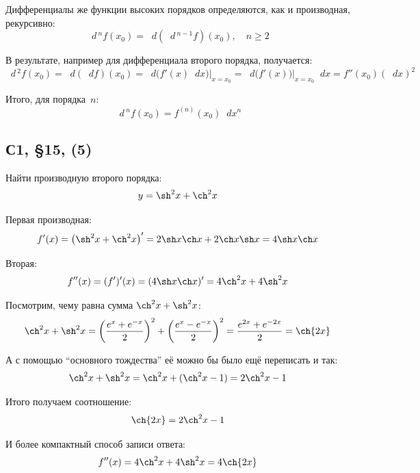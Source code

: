 \documentclass[a4paper,12pt]{article}
\newcommand{\diff}{\mathop{}\!d\!}
\begin{document}
  Дифференциалы же функции высоких порядков определяются, как и производная, рекурсивно:
  \[
    \diff\,^n f(x_0) = \diff \left(\diff\,^{n - 1} f\right)(x_0),\quad n \geq 2
  \]

  В результате, например для дифференциала второго порядка, получается:
  \[
    \diff\,^2 f(x_0) = \diff(\diff f)(x_0) = \left.\diff\bigl(f'(x) \diff x\bigr)\right|_{x = x_0}
      = \left.\diff\bigl(f'(x)\bigr)\right|_{x = x_0} \diff x
      = f''(x_0) (\diff x)^2
  \]

  Итого, для порядка~$n$:
  \begin{equation}
    \diff\,^n f(x_0) = f^{(n)}(x_0) \diff x^n
  \end{equation}
  

  \subsection{С1, \S 15, (5)}

  Найти производную второго порядка:
  \[
    y = \sh^2 x + \ch^2 x
  \]
  
  \begin{solution}
    Первая производная:
    \[
      f'(x) = \left(\sh^2 x + \ch^2 x\right)' = 2 \sh x \ch x + 2 \ch x \sh x = 4 \sh x \ch x
    \]

    Вторая:
    \[
      f''(x) = (f')'(x) = (4 \sh x \ch x)' = 4 \ch^2 x + 4 \sh^2 x
    \]


    \begin{remark}
      Посмотрим, чему равна сумма $\ch^2 x \hm+ \sh^2 x$:
      \[
        \ch^2 x + \sh^2 x
          = \left(\frac{e^x + e^{-x}}{2}\right)^2 + \left(\frac{e^x - e^{-x}}{2}\right)^2
          = \frac{e^{2x} + e^{-2x}}{2}
          = \ch{2x}
      \]

      А с помощью ``основного тождества'' её можно бы было ещё переписать и так:
      \[
        \ch^2 x + \sh^2 x = \ch^2 x + (\ch^2 x - 1) = 2 \ch^2 x - 1
      \]

      Итого получаем соотношение:
      \[
        \ch{2x} = 2 \ch^2 x - 1
      \]

      И более компактный способ записи ответа:
      \[
        f''(x) = 4 \ch^2 x + 4 \sh^2 x = 4 \ch{2x}
      \]
    \end{remark}
  \end{solution}
\end{document}
